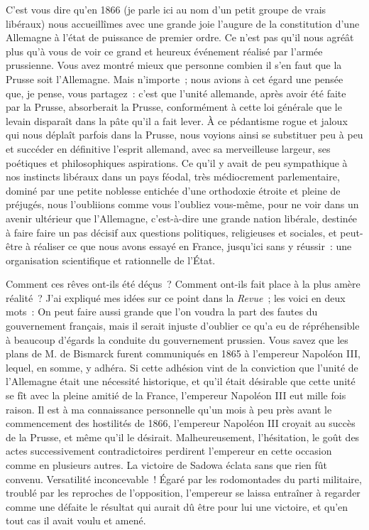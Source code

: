 \documentclass[french,twoside]{book} %
\begin{document}
C’est vous dire qu’en 1866 (je parle ici au nom d’un petit groupe de vrais libéraux) nous accueillîmes avec une grande joie l’augure de la constitution d’une Allemagne à l’état de puissance de premier ordre. Ce n’est pas qu’il nous agréât plus qu’à vous de voir ce grand et heureux événement réalisé par l’armée prussienne. Vous avez montré mieux que personne combien il s’en faut que la Prusse soit l’Allemagne. Mais n’importe ; nous avions à cet égard une pensée que, je pense, vous partagez : c’est que l’unité allemande, après avoir été faite par la Prusse, absorberait la Prusse, conformément à cette loi générale que le levain disparaît dans la pâte qu’il a fait lever. À ce pédantisme rogue et jaloux qui nous déplaît parfois dans la Prusse, nous voyions ainsi se substituer peu à peu et succéder en définitive l’esprit allemand, avec sa merveilleuse largeur, ses poétiques et philosophiques aspirations. Ce qu’il y avait de peu sympathique à nos instincts libéraux dans un pays féodal, très médiocrement parlementaire, dominé par une petite noblesse entichée d’une orthodoxie étroite et pleine de préjugés, nous l’oubliions comme vous l’oubliez vous-même, pour ne voir dans un avenir ultérieur que l’Allemagne, c’est-à-dire une grande nation libérale, destinée à faire faire un pas décisif aux questions politiques, religieuses et sociales, et peut-être à réaliser ce que nous avons essayé en France, jusqu’ici sans y réussir : une organisation scientifique et rationnelle de l’État.\par
Comment ces rêves ont-ils été déçus ? Comment ont-ils fait place à la plus amère réalité ? J’ai expliqué mes idées sur ce point dans la {\itshape Revue} ; les voici en deux mots : On peut faire aussi grande que l’on voudra la part des fautes du gouvernement français, mais il serait injuste d’oublier ce qu’a eu de répréhensible à beaucoup d’égards la conduite du gouvernement prussien. Vous savez que les plans de M. de Bismarck furent communiqués en 1865 à l’empereur Napoléon III, lequel, en somme, y adhéra. Si cette adhésion vint de la conviction que l’unité de l’Allemagne était une nécessité historique, et qu’il était désirable que cette unité se fît avec la pleine amitié de la France, l’empereur Napoléon III eut mille fois raison. Il est à ma connaissance personnelle qu’un mois à peu près avant le commencement des hostilités de 1866, l’empereur Napoléon III croyait au succès de la Prusse, et même qu’il le désirait. Malheureusement, l’hésitation, le goût des actes successivement contradictoires perdirent l’empereur en cette occasion comme en plusieurs autres. La victoire de Sadowa éclata sans que rien fût convenu. Versatilité inconcevable ! Égaré par les rodomontades du parti militaire, troublé par les reproches de l’opposition, l’empereur se laissa entraîner à regarder comme une défaite le résultat qui aurait dû être pour lui une victoire, et qu’en tout cas il avait voulu et amené.\par
\end{document}
